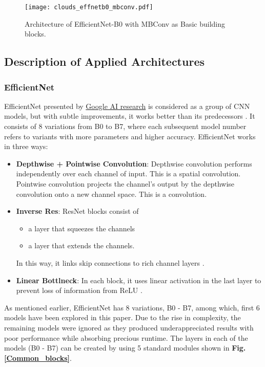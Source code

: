 \documentclass[conference]{IEEEtran}
\begin{document}
\begin{figure}
    \centering
    \texttt{[image: clouds\_effnetb0\_mbconv.pdf]}
    \caption{Architecture of EfficientNet-B0 with MBConv as Basic building blocks.}
    \label{mbconv}
\end{figure}




\subsection{Description of Applied Architectures}
\subsubsection{EfficientNet}

EfficientNet presented by \href{https://ai.google/research/}{Google AI research} is considered as a group of CNN models, but with subtle improvements, it works better than its predecessors \cite{tan2019efficientnet}. It consists of 8 variations from B0 to B7, where each subsequent model number refers to variants with more parameters and higher accuracy. EfficientNet works in three ways:
\begin{itemize}
    \item \textbf{Depthwise + Pointwise Convolution}: Depthwise convolution performs independently over each channel of input. This is a spatial convolution. Pointwise convolution projects the channel's output by the depthwise convolution onto a new channel space. This is a  convolution.
    \item \textbf{Inverse Res}: ResNet blocks consist of 
    \begin{itemize} 
        \item a layer that squeezes the channels
        \item a layer that extends the channels. 
    \end{itemize}
    In this way, it links skip connections to rich channel layers \cite{he2016deep}.
    \item \textbf{Linear Bottlneck}: In each block, it uses linear activation in the last layer to prevent loss of information from ReLU \cite{agarap2018deep}. 
\end{itemize}


As mentioned earlier, EfficientNet has 8 variations, B0 - B7, among which, first 6 models have been explored in this paper. Due to the rise in complexity, the remaining models were ignored as they produced underappreciated results with poor performance while absorbing precious runtime. The layers in each of the models (B0 - B7) can be created by using 5 standard modules shown in \textbf{Fig. \ref{Common_blocks}}. 
\end{document}
